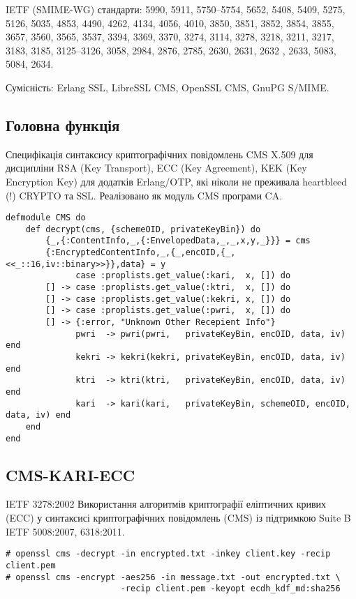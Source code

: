 IETF (SMIME-WG) стандарти: 5990, 5911, 5750--5754, 5652, 5408, 5409,
5275, 5126, 5035, 4853, 4490, 4262, 4134, 4056, 4010, 3850, 3851,
3852, 3854, 3855, 3657, 3560, 3565, 3537, 3394, 3369, 3370, 3274,
3114, 3278, 3218, 3211, 3217, 3183, 3185, 3125--3126, 3058, 2984,
2876, 2785, 2630, 2631, 2632 , 2633, 5083, 5084, 2634.

Сумісність: Erlang SSL, LibreSSL CMS, OpenSSL CMS, GnuPG S/MIME.

\subsection{Головна функція}

Специфікація синтаксису криптографічних повідомлень CMS X.509 для
дисципліни RSA (Key Transport), ECC (Key Agreement), KEK (Key Encryption Key)
для додатків Erlang/OTP, які ніколи не преживала heartbleed (!) CRYPTO та SSL.
Реалізовано як модуль CMS програми CA.

\renewcommand{\footnotesize}{\scriptsize}

\begin{lstlisting}
defmodule CMS do
    def decrypt(cms, {schemeOID, privateKeyBin}) do
        {_,{:ContentInfo,_,{:EnvelopedData,_,_,x,y,_}}} = cms
        {:EncryptedContentInfo,_,{_,encOID,{_,<<_::16,iv::binary>>}},data} = y
              case :proplists.get_value(:kari,  x, []) do
        [] -> case :proplists.get_value(:ktri,  x, []) do
        [] -> case :proplists.get_value(:kekri, x, []) do
        [] -> case :proplists.get_value(:pwri,  x, []) do
        [] -> {:error, "Unknown Other Recepient Info"}
              pwri  -> pwri(pwri,   privateKeyBin, encOID, data, iv) end
              kekri -> kekri(kekri, privateKeyBin, encOID, data, iv) end
              ktri  -> ktri(ktri,   privateKeyBin, encOID, data, iv) end
              kari  -> kari(kari,   privateKeyBin, schemeOID, encOID, data, iv) end
    end
end
\end{lstlisting}

\newpage
\subsection{CMS-KARI-ECC}

IETF 3278:2002 Використання алгоритмів криптографії еліптичних
кривих (ECC) у синтаксисі криптографічних повідомлень (CMS) із
підтримкою Suite B IETF 5008:2007, 6318:2011.

\begin{lstlisting}
# openssl cms -decrypt -in encrypted.txt -inkey client.key -recip client.pem
# openssl cms -encrypt -aes256 -in message.txt -out encrypted.txt \
                       -recip client.pem -keyopt ecdh_kdf_md:sha256
\end{lstlisting}

